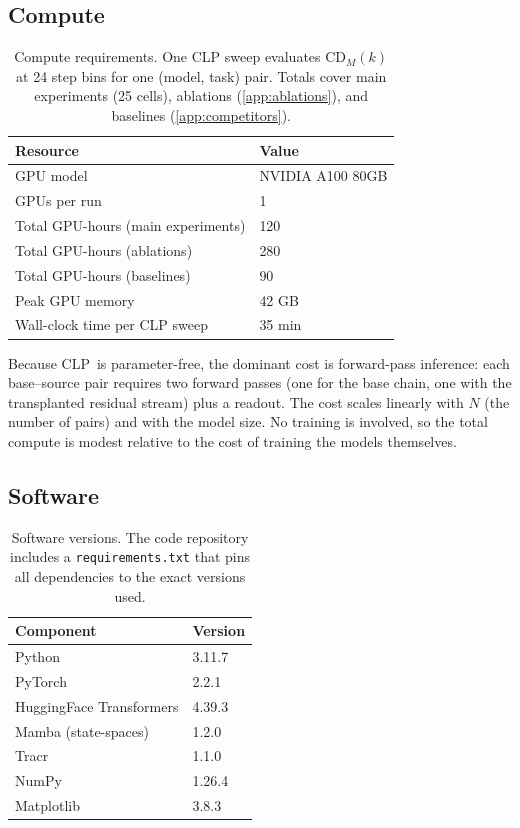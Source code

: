\documentclass[11pt]{article}
\newcommand{\CDM}{\mathrm{CD}_{M}}
\newcommand{\stepk}{k}
\newcommand{\CLP}{\textsc{CLP}}
\begin{document}
\subsection{Compute}
\label{app:exp-compute}

\begin{table}[t]
\centering\small
\begin{tabular}{@{}ll@{}}
\toprule
Resource & Value \\
\midrule
GPU model & NVIDIA A100 80GB \\
GPUs per run & 1 \\
Total GPU-hours (main experiments) & 120 \\
Total GPU-hours (ablations) & 280 \\
Total GPU-hours (baselines) & 90 \\
Peak GPU memory & 42 GB \\
Wall-clock time per CLP sweep & 35 min \\
\bottomrule
\end{tabular}
\caption{Compute requirements. One CLP sweep evaluates $\CDM(\stepk)$ at
24 step bins for one (model, task) pair. Totals cover main experiments
(25 cells), ablations (\cref{app:ablations}), and baselines
(\cref{app:competitors}).}
\label{tab:compute}
\end{table}

Because \CLP\ is parameter-free, the dominant cost is forward-pass inference:
each base--source pair requires two forward passes (one for the base chain, one
with the transplanted residual stream) plus a readout. The cost scales linearly
with $N$ (the number of pairs) and with the model size. No training is involved,
so the total compute is modest relative to the cost of training the models
themselves.

\subsection{Software}
\label{app:exp-software}

\begin{table}[t]
\centering\small
\begin{tabular}{@{}ll@{}}
\toprule
Component & Version \\
\midrule
Python & 3.11.7 \\
PyTorch & 2.2.1 \\
HuggingFace Transformers & 4.39.3 \\
Mamba (state-spaces) & 1.2.0 \\
Tracr & 1.1.0 \\
NumPy & 1.26.4 \\
Matplotlib & 3.8.3 \\
\bottomrule
\end{tabular}
\caption{Software versions. The code repository includes a
\texttt{requirements.txt} that pins all dependencies to the exact versions used.}
\label{tab:software}
\end{table}
\end{document}
